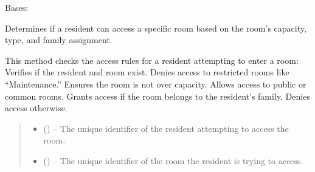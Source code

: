\documentclass[letterpaper,10pt,english]{sphinxmanual}
\begin{document}
\begin{fulllineitems}
\label{\detokenize{app.controllers:app.controllers.room_controller.RoomController}}
\pysigstartsignatures
\pysiglinewithargsret
{}
{}
{}
\pysigstopsignatures
\sphinxAtStartPar
Bases: 

\begin{fulllineitems}
\label{\detokenize{app.controllers:app.controllers.room_controller.RoomController.access_room}}
\pysigstartsignatures
\pysiglinewithargsret
{}
{\sphinxparamcomma {}\sphinxparamcomma {}}
{}
\pysigstopsignatures
\sphinxAtStartPar
Determines if a resident can access a specific room based on the room’s capacity,
type, and family assignment.

\sphinxAtStartPar
This method checks the access rules for a resident attempting to enter a room:
\sphinxhyphen{} Verifies if the resident and room exist.
\sphinxhyphen{} Denies access to restricted rooms like “Maintenance.”
\sphinxhyphen{} Ensures the room is not over capacity.
\sphinxhyphen{} Allows access to public or common rooms.
\sphinxhyphen{} Grants access if the room belongs to the resident’s family.
\sphinxhyphen{} Denies access otherwise.
\begin{quote}\begin{description}
\begin{itemize}
\item {} 
\sphinxAtStartPar
{} () – The unique identifier of the resident attempting to access the room.

\item {} 
\sphinxAtStartPar
{} () – The unique identifier of the room the resident is trying to access.


\end{itemize}
\end{description}
\end{quote}
\end{fulllineitems}
\end{fulllineitems}
\end{document}
